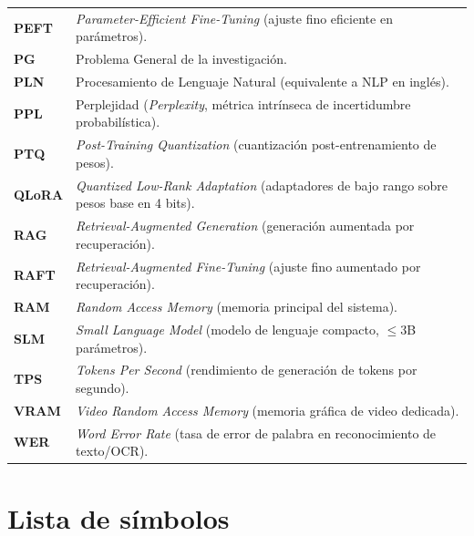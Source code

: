 \begin{table}[H]
\begin{tabularx}{\textwidth}{@{}p{3.2cm}X@{}}
\textbf{PEFT} & \textit{Parameter-Efficient Fine-Tuning} (ajuste fino eficiente en parámetros). \\
\textbf{PG} & Problema General de la investigación. \\
\textbf{PLN} & Procesamiento de Lenguaje Natural (equivalente a NLP en inglés). \\
\textbf{PPL} & Perplejidad (\textit{Perplexity}, métrica intrínseca de incertidumbre probabilística). \\
\textbf{PTQ} & \textit{Post-Training Quantization} (cuantización post-entrenamiento de pesos). \\
\textbf{QLoRA} & \textit{Quantized Low-Rank Adaptation} (adaptadores de bajo rango sobre pesos base en 4 bits). \\
\textbf{RAG} & \textit{Retrieval-Augmented Generation} (generación aumentada por recuperación). \\
\textbf{RAFT} & \textit{Retrieval-Augmented Fine-Tuning} (ajuste fino aumentado por recuperación). \\
\textbf{RAM} & \textit{Random Access Memory} (memoria principal del sistema). \\
\textbf{SLM} & \textit{Small Language Model} (modelo de lenguaje compacto, $\le 3$B parámetros). \\
\textbf{TPS} & \textit{Tokens Per Second} (rendimiento de generación de tokens por segundo). \\
\textbf{VRAM} & \textit{Video Random Access Memory} (memoria gráfica de video dedicada). \\
\textbf{WER} & \textit{Word Error Rate} (tasa de error de palabra en reconocimiento de texto/OCR). \\
\bottomrule
\end{tabularx}
\end{table}

\newpage
{}
{}
\section*{Lista de símbolos}

